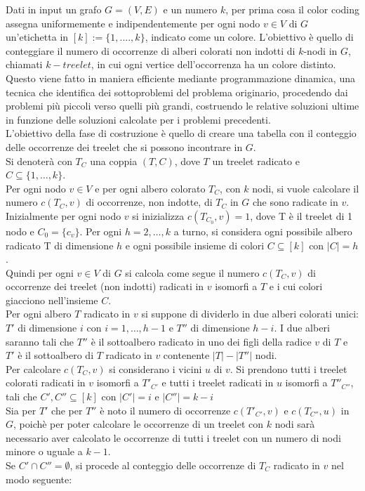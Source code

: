 Dati in input un grafo $ G=(V,E) $ e un numero $ k $, per prima cosa il color coding assegna uniformemente e indipendentemente per ogni nodo $ v\in V $ di $ G $ un'etichetta in $ [k] := \{1,....,k\} $, indicato come un colore.
L'obiettivo \`e quello di conteggiare il numero di occorrenze di alberi colorati non indotti di $ k$-nodi in $ G $, chiamati $ k-treelet $, in cui ogni vertice dell'occorrenza ha un colore distinto.
Questo viene fatto in maniera efficiente mediante  programmazione dinamica, una tecnica che identifica dei sottoproblemi del problema originario, procedendo dai problemi pi\`u piccoli verso quelli pi\`u grandi, costruendo le relative soluzioni ultime in funzione delle soluzioni calcolate per i problemi precedenti.\\
L'obiettivo della fase di costruzione \`e quello di creare una tabella con il conteggio delle occorrenze dei treelet che si possono incontrare in $ G $.\\
Si denoter\`a con $ T_C $ una coppia $ (T,C) $, dove $ T $ un treelet radicato e $ C \subseteq {\{1,\dots,k\}} $.\\
Per ogni nodo $ v \in V $ e per ogni albero colorato $ T_C $, con $ k $ nodi, si vuole calcolare il numero $ c(T_C , v) $ di occorrenze, non indotte, di $ T_C $  in $ G $ che sono radicate in $ v $.\\
Inizialmente per ogni nodo $ v $ si inizializza $ c(T_{C_0} , v) = 1 $, dove T \`e il treelet di 1 nodo e $ C_0 = \{c_v\} $.
Per ogni $ h = 2,\dots,k $ a turno, si considera ogni possibile albero radicato T di dimensione $ h $ e ogni possibile insieme di colori $ C \subseteq [k] $ con $ |C| = h $.\\
Quindi per ogni $ v \in V$ di $ G $ si calcola come segue il numero $ c(T_C,v) $ di occorrenze dei treelet (non indotti) radicati in $ v $ isomorfi a $ T $ e i cui colori giacciono nell'insieme $ C $.\\
Per ogni albero $ T $ radicato in $ v $ si suppone di dividerlo in due alberi colorati unici: $ T' $ di dimensione $ i $ con $ i = 1, \dots,h-1 $ e $ T'' $ di dimensione $ h-i $.
I due alberi saranno tali che  $ T'' $ \`e il sottoalbero radicato in uno dei figli della radice $ v $ di $ T $ e $ T' $ \`e il sottoalbero di $ T $ radicato in $ v $ contenente $ |T| - |T''| $ nodi.\\
Per calcolare $ c(T_C,v) $ si considerano i vicini $ u $ di $ v $.
Si prendono  tutti i treelet colorati radicati in $ v $ isomorfi a $ T'_{C'} $ e tutti i  treelet radicati in $ u $ isomorfi a $ T''_{C''} $, tali che $ C',C'' \subseteq [k] $ con $ |C'|=i $ e $ |C''| = k-i $ \\
Sia per $ T' $ che per $ T'' $ \`e noto il numero di occorrenze $ c(T'_{C'},v) $ e $ c(T_{C''},u) $ in $ G $, poich\`e per poter calcolare le occorrenze di un treelet con $ k $ nodi sar\`a necessario aver calcolato le occorrenze di tutti i treelet con un numero di nodi minore o uguale a $ k-1 $.\\
Se $ C' \cap C'' = \emptyset $, si procede al conteggio delle occorrenze di $ T_C $ radicato in $ v $ nel modo seguente:

